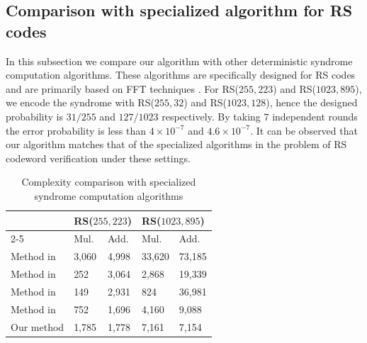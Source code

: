 \documentclass[a4paper, 10pt]{article}
\begin{document}
\subsection{Comparison with specialized algorithm for RS codes}
In this subsection we compare our algorithm with other deterministic syndrome computation algorithms. These algorithms are specifically designed for RS codes and are primarily based on FFT techniques \cite{4395269} \cite{6176255} \cite{5910103} \cite{9925209}. For RS($255,223$) and RS($1023,895$), we encode the syndrome with RS($255,32$) and RS($1023,128$), hence the designed probability is $31/255$ and $127/1023$ respectively. By taking $7$ independent rounds the error probability is less than $4\times10^{-7}$ and $4.6\times 10^{-7}$. It can be observed that our algorithm matches that of the specialized algorithms in the problem of RS codeword verification under these settings. 

\begin{table}[h]
\centering
\caption{Complexity comparison with specialized syndrome computation algorithms}
\begin{tabular}{|l|ll|ll|}
\hline
\multirow{2}{*}{} & \multicolumn{2}{l|}{RS($255,223$)} & \multicolumn{2}{l|}{RS($1023,895$)} \\ \cline{2-5} 
                  & \multicolumn{1}{l|}{Mul.}  & Add.  & \multicolumn{1}{l|}{Mul.}   & Add.  \\ \hline
Method in  \cite{4395269}       & \multicolumn{1}{l|}{3,060}  & 4,998  & \multicolumn{1}{l|}{33,620}  & 73,185 \\ \hline
Method in  \cite{6176255}      & \multicolumn{1}{l|}{252}   & 3,064  & \multicolumn{1}{l|}{2,868}   & 19,339 \\ \hline
Method in    \cite{5910103}     & \multicolumn{1}{l|}{149}   & 2,931  & \multicolumn{1}{l|}{824}    & 36,981 \\ \hline
Method in    \cite{9925209}     & \multicolumn{1}{l|}{752}   & 1,696  & \multicolumn{1}{l|}{4,160}   & 9,088  \\ \hline
Our method        & \multicolumn{1}{l|}{1,785}      &   1,778    & \multicolumn{1}{l|}{7,161}       &  7,154     \\ \hline
\end{tabular}

\end{table}




\end{document}

